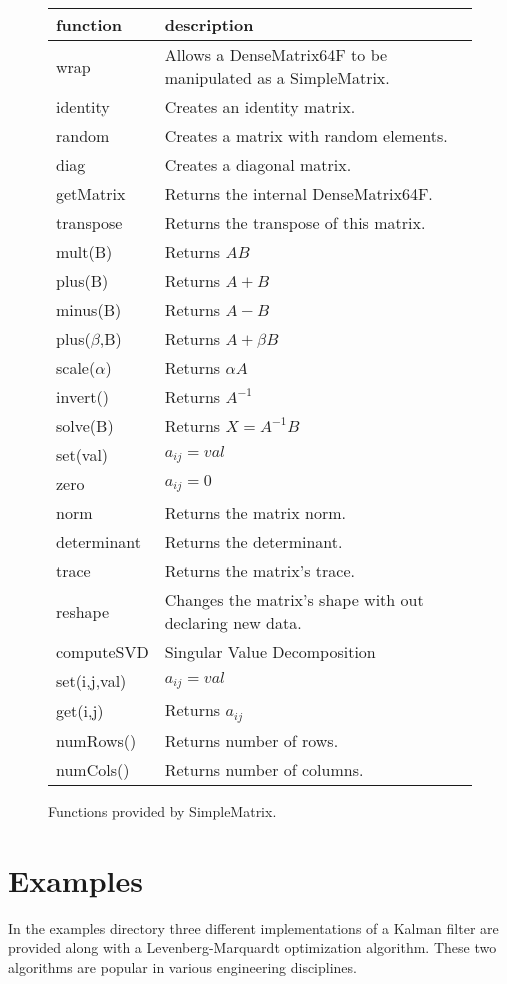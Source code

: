 \documentclass[12pt]{article}%
\begin{document}
\begin{figure}[h]
\begin{tabular}{ll}
function & description \\
\hline
wrap & Allows a DenseMatrix64F to be manipulated as a SimpleMatrix. \\
identity & Creates an identity matrix.\\
random & Creates a matrix with random elements.\\
diag & Creates a diagonal matrix. \\
getMatrix & Returns the internal DenseMatrix64F.\\
transpose & Returns the transpose of this matrix.\\
mult(B) & Returns $AB$\\
plus(B) & Returns $A+B$\\
minus(B) & Returns $A-B$\\
plus($\beta$,B) & Returns $A+\beta B$\\
scale($\alpha$) & Returns $\alpha A$\\
invert() & Returns $A^{-1}$\\
solve(B) & Returns $X=A^{-1}B$\\
set(val) & $a_{ij} = val$\\
zero & $a_{ij} = 0$ \\
norm & Returns the matrix norm. \\
determinant & Returns the determinant. \\
trace & Returns the matrix's trace. \\
reshape & Changes the matrix's shape with out declaring new data. \\
computeSVD & Singular Value Decomposition \\
set(i,j,val) & $a_{ij} = val$ \\
get(i,j) & Returns $a_{ij}$ \\
numRows() & Returns number of rows.\\
numCols() & Returns number of columns.\\
\end{tabular}
\caption{\label{fig:simplefuncs}Functions provided by SimpleMatrix.}
\end{figure}


\section{Examples}
In the examples directory three different implementations of a Kalman filter are provided along with a Levenberg-Marquardt optimization algorithm.  These two algorithms are popular in various engineering disciplines.
\end{document}
